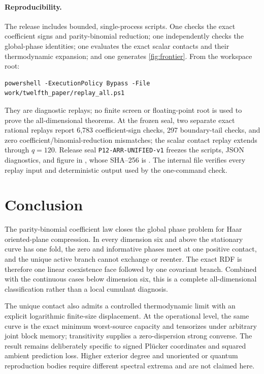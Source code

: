 \documentclass[11pt,a4paper]{article}
\begin{document}
\paragraph{Reproducibility.}
The release includes bounded, single-process scripts.  One checks the exact
coefficient signs and parity-binomial reduction; one independently checks the
global-phase identities; one evaluates the exact scalar contacts and their
thermodynamic expansion; and one generates \cref{fig:frontier}.  From the
workspace root:
\begin{verbatim}
powershell -ExecutionPolicy Bypass -File work/twelfth_paper/replay_all.ps1
\end{verbatim}
They are diagnostic replays; no finite screen or floating-point root is used
to prove the all-dimensional theorems.  At the frozen seal, two separate exact
rational replays report 6,783 coefficient-sign checks, 297 boundary-tail
checks, and zero coefficient/binomial-reduction mismatches; the scalar contact
replay extends through $q=120$.  Release seal
\texttt{P12-ARR-UNIFIED-v1} freezes the scripts, JSON diagnostics, and figure
in , whose SHA--256 is
\texttt{}.
The internal file  verifies every replay input
and deterministic output used by the one-command check.

\section{Conclusion}

The parity-binomial coefficient law closes the global phase problem for Haar
oriented-plane compression.  In every dimension six and above the stationary
curve has one fold, the zero and informative phases meet at one positive
contact, and the unique active branch cannot exchange or reenter.  The exact
RDF is therefore one linear coexistence face followed by one covariant branch.
Combined with the continuous cases below dimension six, this is a complete
all-dimensional classification rather than a local cumulant diagnosis.

The unique contact also admits a controlled thermodynamic limit with an
explicit logarithmic finite-size displacement.  At the operational level, the
same curve is the exact minimum worst-source capacity and tensorizes under
arbitrary joint block memory; transitivity supplies a zero-dispersion strong
converse.  The result remains deliberately specific to signed Pl\"ucker
coordinates and squared ambient prediction loss.  Higher exterior degree and
unoriented or quantum reproduction bodies require different spectral
extrema and are not claimed here.
\end{document}
